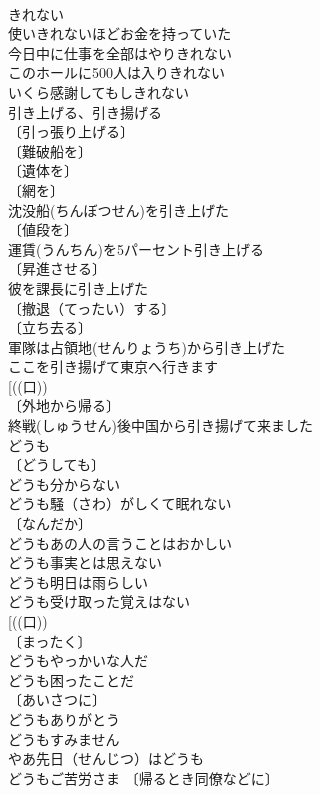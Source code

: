 \documentclass[8pt]{extreport}
\begin{document}
\begin{CJK}{UTF8}{min}
\\	きれない	
\\	使いきれないほどお金を持っていた 
\\	今日中に仕事を全部はやりきれない 
\\	このホールに500人は入りきれない 
\\	いくら感謝してもしきれない 
\\	引き上げる、引き揚げる	
\\	〔引っ張り上げる〕
\\	〔難破船を〕
\\	〔遺体を〕
\\	〔網を〕
\\	沈没船(ちんぼつせん)を引き上げた 
\\	〔値段を〕
\\	運賃(うんちん)を5パーセント引き上げる 
\\	〔昇進させる〕
\\	彼を課長に引き上げた 
\\	〔撤退（てったい）する〕
\\	〔立ち去る〕
\\	軍隊は占領地(せんりょうち)から引き上げた 
\\	ここを引き揚げて東京へ行きます 
\\	[((口))
\\	〔外地から帰る〕
\\	終戦(しゅうせん)後中国から引き揚げて来ました 
\\	どうも	
\\	〔どうしても〕
\\	どうも分からない 
\\	どうも騒（さわ）がしくて眠れない 
\\	〔なんだか〕
\\	どうもあの人の言うことはおかしい 
\\	どうも事実とは思えない 
\\	どうも明日は雨らしい 
\\	どうも受け取った覚えはない 
\\	[((口)) 
\\	〔まったく〕 
\\	どうもやっかいな人だ 
\\	どうも困ったことだ 
\\	〔あいさつに〕
\\	どうもありがとう 
\\	どうもすみません 
\\	やあ先日（せんじつ）はどうも 
\\	どうもご苦労さま 〔帰るとき同僚などに〕

\end{CJK}
\end{document}
